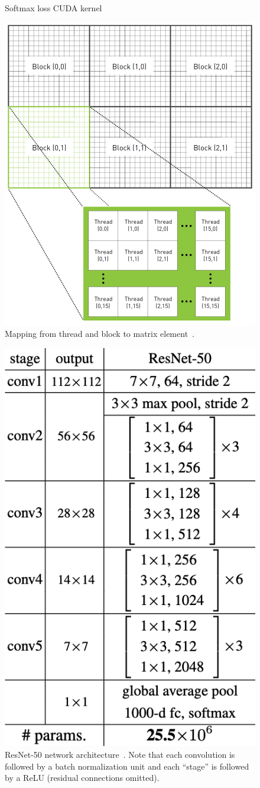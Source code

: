\documentclass[portrait,final,archD,fontscale=0.477]{baposter}
\begin{document}
\begin{poster}
{    \begin{figure}[H]
      \centering
      \caption{Softmax loss CUDA kernel}
      \label{fig:cuda_hello_world}
    \end{figure}
    \begin{figure}[H]
      \centering
      \includegraphics[width=.7\linewidth]{figures/matrix_thread.png}
      \caption{Mapping from thread and block to matrix element~\cite{10.5555/1891996}.}\label{fig:figure}
    \end{figure}
    \begin{figure}[H]
      \centering
      \includegraphics[width=0.5\linewidth]{figures/resnet50.png}
      \caption{ResNet-50 network architecture~\cite{he2015deep}. Note that each convolution is followed by a batch normalization unit and each ``stage'' is followed by a ReLU (residual connections omitted).}\label{fig:resnet}
    \end{figure}

}
\end{poster}
\end{document}
